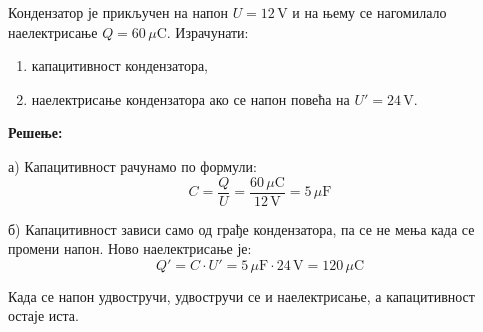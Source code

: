 \documentclass{article}
\begin{document}
\begin{primer}
Кондензатор је прикључен на напон $U = 12\,\text{V}$ и на њему се нагомилало
наелектрисање $Q = 60\,\mu\text{C}$. Израчунати:
\begin{enumerate}
    \item[а)] капацитивност кондензатора,
    \item[б)] наелектрисање кондензатора ако се напон повећа на $U' = 24\,\text{V}$.
\end{enumerate}

\textbf{Решење:}

а) Капацитивност рачунамо по формули:
\[
C = \frac{Q}{U} = \frac{60\,\mu\text{C}}{12\,\text{V}} = 5\,\mu\text{F}
\]

б) Капацитивност зависи само од грађе кондензатора, па се не мења када се
промени напон. Ново наелектрисање је:
\[
Q' = C \cdot U' = 5\,\mu\text{F} \cdot 24\,\text{V} = 120\,\mu\text{C}
\]

Када се напон удвостручи, удвостручи се и наелектрисање, а капацитивност
остаје иста.
\end{primer}

\end{document}
